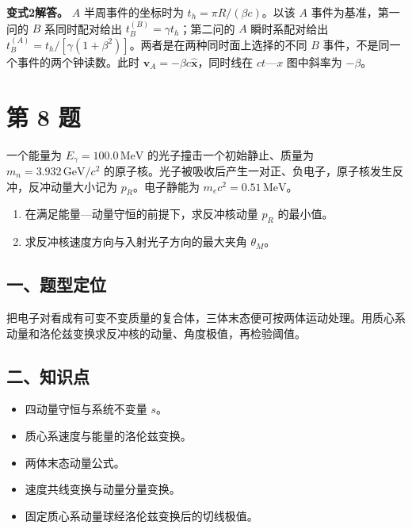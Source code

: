 \documentclass[12pt,a4paper,UTF8]{ctexart}
\newcommand{\tightlist}{\setlength{\itemsep}{0pt}\setlength{\parskip}{0pt}}
\begin{document}
\textbf{变式2解答。} \(A\) 半周事件的坐标时为
\(t_h=\pi R/(\beta c)\)。以该 \(A\) 事件为基准，第一问的 \(B\)
系同时配对给出 \(t_B^{(B)}=\gamma t_h\)；第二问的 \(A\) 瞬时系配对给出
\(t_B^{(A)}=t_h/[\gamma(1+\beta^2)]\)。两者是在两种同时面上选择的不同
\(B\) 事件，不是同一个事件的两个钟读数。此时
\(\boldsymbol v_A=-\beta c\hat{\boldsymbol x}\)，同时线在 \(ct\)---\(x\)
图中斜率为 \(-\beta\)。

\newpage

\section{第 8 题}\label{ux7b2c-8-ux9898}

一个能量为 \(E_\gamma=100.0\,\mathrm{MeV}\)
的光子撞击一个初始静止、质量为 \(m_n=3.932\,\mathrm{GeV}/c^2\)
的原子核。光子被吸收后产生一对正、负电子，原子核发生反冲，反冲动量大小记为
\(p_R\)。电子静能为 \(m_ec^2=0.51\,\mathrm{MeV}\)。

\begin{enumerate}
\def\labelenumi{\arabic{enumi}.}
\tightlist
\item
  在满足能量---动量守恒的前提下，求反冲核动量 \(p_R\) 的最小值。
\item
  求反冲核速度方向与入射光子方向的最大夹角 \(\theta_M\)。
\end{enumerate}

\subsection{一、题型定位}\label{ux4e00ux9898ux578bux5b9aux4f4d-7}

把电子对看成有可变不变质量的复合体，三体末态便可按两体运动处理。用质心系动量和洛伦兹变换求反冲核的动量、角度极值，再检验阈值。

\subsection{二、知识点}\label{ux4e8cux77e5ux8bc6ux70b9-7}

\begin{itemize}
\tightlist
\item
  四动量守恒与系统不变量 \(s\)。
\item
  质心系速度与能量的洛伦兹变换。
\item
  两体末态动量公式。
\item
  速度共线变换与动量分量变换。
\item
  固定质心系动量球经洛伦兹变换后的切线极值。
\end{itemize}
\end{document}
